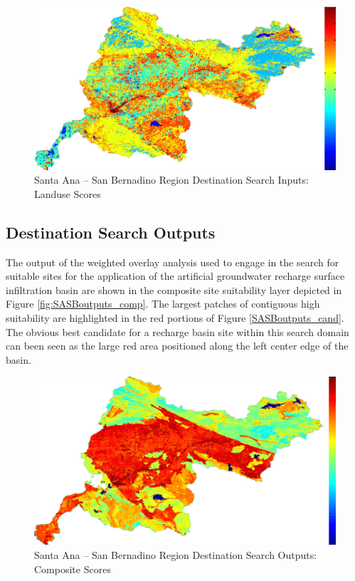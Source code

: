         \begin{figure}[!h]
            \begin{center}
            \includegraphics[width=5.5in]{figures/SanBernadino_Search_Landuse.png}   
            \caption{Santa Ana -- San Bernadino Region Destination Search Inputs: Landuse Scores}
            \label{fig:SASBdsinputs_landuse}
            \end{center}
        \end{figure}
    
    \subsection{Destination Search Outputs}
    
The output of the weighted overlay analysis used to engage in the search for suitable sites for the application of the artificial groundwater recharge surface infiltration basin are shown in the composite site suitability layer depicted in Figure \ref{fig:SASBoutputs_comp}. The largest patches of contiguous high suitability are highlighted in the red portions of Figure \ref{SASBoutputs_cand}. The obvious best candidate for a recharge basin site within this search domain can been seen as the large red area positioned along the left center edge of the basin.
    
        \begin{figure}[!h]
            \begin{center}
            \includegraphics[width=5.5in]{figures/SanBernadino_Search_Composite.png}   
            \caption{Santa Ana -- San Bernadino Region Destination Search Outputs: Composite Scores}
            \label{fig:SASBdsoutputs_comp}
            \end{center}
        \end{figure}
        
